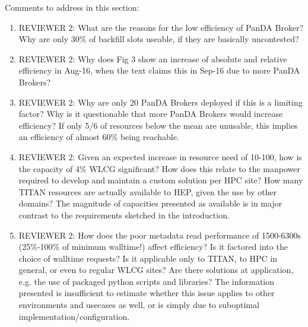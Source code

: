 \ifreview
Comments to address in this section:
\begin{enumerate}
    \color{red} 
    
    \item REVIEWER 2: What are the reasons for the low efficiency of PanDA
    Broker? Why are only 30\% of backfill slots useable, if they are
    basically uncontested?
    
    \item REVIEWER 2: Why does Fig 3 show an increase of absolute and
    relative efficiency in Aug-16, when the text claims this in Sep-16 due to
    more PanDA Brokers?
    
    \item REVIEWER 2: Why are only 20 PanDA Brokers deployed if this is a
    limiting factor? Why is it questionable that more PanDA Brokers would
    increase efficiency? If only 5/6 of resources below the mean are
    unusable, this implies an efficiency of almost 60\% being
    reachable.

    \item REVIEWER 2: Given an expected increase in resource need of 10-100,
    how is the capacity of 4\% WLCG significant? How does this relate to the
    manpower required to develop and maintain a custom solution per HPC site?
    How many TITAN resources are actually available to HEP, given the use by
    other domains? The magnitude of capacities presented as available is in
    major contrast to the requirements sketched in the introduction.
    
    \item REVIEWER 2: How does the poor metadata read performance of
    1500-6300s (25\%-100\% of minimum walltime!) affect efficiency? Is it
    factored into the choice of walltime requests? Is it applicable only
    to TITAN, to HPC in general, or even to regular WLCG sites? Are there solutions at
    application, e.g. the use of packaged python scripts and
    libraries? The information presented is
    insufficient to estimate whether this issue applies to other environments
    and usecases as well, or is simply due to suboptimal
    implementation/configuration.
    

\end{enumerate}
